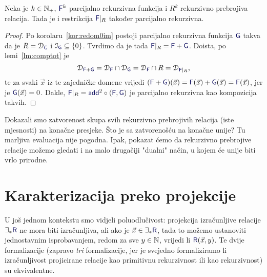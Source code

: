 \begin{korolar}[{name=[teorem o restrikciji]}]\label{kor:restre}
Neka je $k\in{\mathbb N}_+$, $\f F^k$ parcijalno rekurzivna funkcija i $R^k$ rekurzivno prebrojiva relacija. Tada je i restrikcija $\f F|_R$ također parcijalno rekurzivna.
\end{korolar}
\begin{proof}
Po korolaru~\ref{kor:redom0im} postoji parcijalno rekurzivna funkcija $\f G$ takva da je $R=\dom{\f G}$ i $\im{\f G}\subseteq\{0\}$. Tvrdimo da je tada $\f F|_R=\f F+\f G$. Doista, po lemi~\ref{lm:comptot} je
\begin{equation}
\dom{\f F+\f G}=\dom{\f F}\cap\dom{\f G}=\dom{\f F}\cap R=\dom{\f F|_R}\text,
\end{equation}
te za svaki $\vec x$ iz te zajedničke domene vrijedi $(\f F+\f G)(\vec x)=\f F(\vec x)+\f G(\vec x)=\f F(\vec x)$, jer je $\f G(\vec x)=0$. Dakle, $\f F|_R=\f{add}^2\circ(\f F,\f G)$ je parcijalno rekurzivna kao kompozicija takvih.
\end{proof}

Dokazali smo zatvorenost skupa svih rekurzivno prebrojivih relacija (iste mjesnosti) na konačne presjeke. Što je sa zatvorenošću na konačne unije? Tu marljiva evaluacija nije pogodna. Ipak, pokazat ćemo da rekurzivno prebrojive relacije možemo gledati i na malo drugačiji "dualni" način, u kojem će unije biti vrlo prirodne.

\section{Karakterizacija preko projekcije}

U još jednom kontekstu smo vidjeli poluodlučivost: projekcija izračunljive relacije $\exists_*\f R$ ne mora biti izračunljiva, ali ako je $\vec x\in\exists_*\f R$, tada to možemo ustanoviti jednostavnim isprobavanjem, redom za sve $y\in{\mathbb N}$, vrijedi li $\f R(\vec x,y)$. Te dvije formalizacije (zapravo \emph{tri} formalizacije, jer je svejedno formaliziramo li izračunljivost projicirane relacije kao primitivnu rekurzivnost ili kao rekurzivnost) su ekvivalentne.

